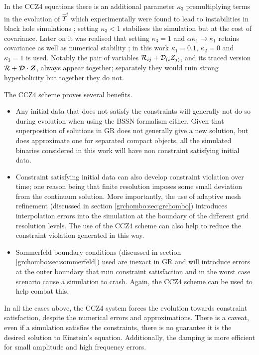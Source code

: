 In the CCZ4 equations there is an additional parameter $\kappa_3$ premultiplying terms in the evolution of $\hat{\Upsilon}^i$ which experimentally were found to lead to instabilities in black hole simulations \cite{PhysRevD.85.064040}; setting $\kappa_3<1$ stabilises the simulation but at the cost of covariance. Later on it was realised that setting $\kappa_3=1$ and $\alpha\kappa_1\rightarrow\kappa_1$ retains covariance as well as numerical stability \cite{Alic:2013xsa}; in this work $\kappa_1=0.1$, $\kappa_2=0$ and $\kappa_3=1$ is used. Notably the pair of variables $\mathcal{R}_{ij} + \mathcal{D}_{(i}Z_{j)}$, and its traced version
$\mathcal{R} + \boldsymbol{\mathcal{D}}\cdot \boldsymbol{Z}$, always appear together; separately they would ruin
strong hyperbolicity but together they do not.


The CCZ4 scheme proves several benefits.
\begin{itemize}
\item Any initial data that does not satisfy the constraints will generally not do so during evolution when using the BSSN formalism either. Given that superposition of solutions in GR does not generally give a new solution, but does approximate one for separated compact objects, all the simulated binaries considered in this work will have non constraint satisfying initial data.
\item Constraint satisfying initial data can also develop constraint violation over time; one reason being that finite resolution imposes some small deviation from the continuum solution. More importantly, the use of adaptive mesh refinement (discussed in section \ref{grchombo:sec:grchombo}) introduces interpolation errors into the simulation at the boundary of the different grid resolution levels. The use of the CCZ4 scheme can also help to reduce the constraint violation generated in this way.
\item Sommerfeld boundary conditions (discussed in section \ref{grchombo:sec:sommerfeld}) used are inexact in GR and will introduce errors at the outer boundary that ruin constraint satisfaction and in the worst case scenario cause a simulation to crash. Again, the CCZ4 scheme can be used to help combat this.
\end{itemize}
In all the cases above, the CCZ4 system forces the evolution towards constraint satisfaction, despite the numerical errors and approximations. There is a caveat, even if a simulation satisfies the constraints, there is no guarantee it is the desired solution to Einstein's equation. Additionally, the damping is more efficient for small amplitude and high frequency errors.




